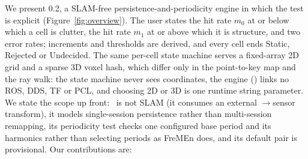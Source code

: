 We present \emph{\sname} 0.2, a SLAM-free persistence-and-periodicity engine in which the test is explicit (Figure~\ref{fig:overview}). The user states the hit rate $m_0$ at or below which a cell is clutter, the hit rate $m_1$ at or above which it is structure, and two error rates; increments and thresholds are derived, and every cell ends Static, Rejected or Undecided. The same per-cell state machine serves a fixed-array 2D grid and a sparse 3D voxel hash, which differ only in the point-to-key map and the ray walk: the state machine never sees coordinates, the engine () links no ROS, DDS, TF or PCL, and choosing 2D or 3D is one runtime string parameter. We state the scope up front: \sname\ is not SLAM (it consumes an external $\to$sensor transform), it models single-session persistence rather than multi-session remapping, its periodicity test checks one configured base period and its harmonics rather than selecting periods as FreMEn does, and its default pair is provisional. Our contributions are:

